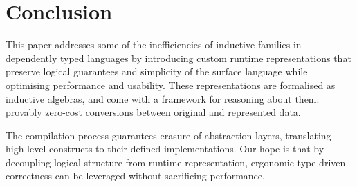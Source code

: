 
\section{Conclusion}

This paper addresses some of the inefficiencies of inductive families in
dependently typed languages by introducing custom runtime representations that
preserve logical guarantees and simplicity of the surface language while
optimising performance and usability. These representations are formalised as inductive
algebras, and come with a framework for reasoning about them: provably zero-cost
conversions between original and represented data.

The compilation process guarantees erasure of abstraction layers, translating
high-level constructs to their defined implementations. Our hope is that by
decoupling logical structure from runtime representation, ergonomic type-driven
correctness can be leveraged without sacrificing performance.
